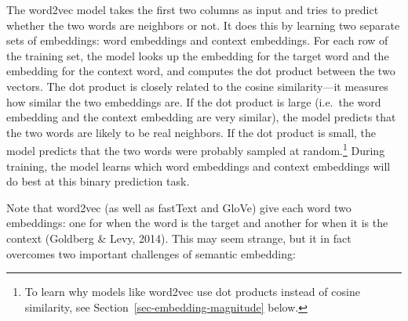 \documentclass[
  man,
  floatsintext,
  longtable,
  nolmodern,
  notxfonts,
  notimes,
  colorlinks=true,linkcolor=blue,citecolor=blue,urlcolor=blue]{apa7}
\begin{document}
The word2vec model takes the first two columns as input and tries to
predict whether the two words are neighbors or not. It does this by
learning two separate sets of embeddings: word embeddings and context
embeddings. For each row of the training set, the model looks up the
embedding for the target word and the embedding for the context word,
and computes the dot product between the two vectors. The dot product is
closely related to the cosine similarity---it measures how similar the
two embeddings are. If the dot product is large (i.e.~the word embedding
and the context embedding are very similar), the model predicts that the
two words are likely to be real neighbors. If the dot product is small,
the model predicts that the two words were probably sampled at
random.\footnote{To learn why models like word2vec use dot products
  instead of cosine similarity, see
  Section~\ref{sec-embedding-magnitude} below.} During training, the
model learns which word embeddings and context embeddings will do best
at this binary prediction task.

Note that word2vec (as well as fastText and GloVe) give each word two
embeddings: one for when the word is the target and another for when it
is the context (Goldberg \& Levy, 2014). This may seem strange, but it
in fact overcomes two important challenges of semantic embedding:
\end{document}
